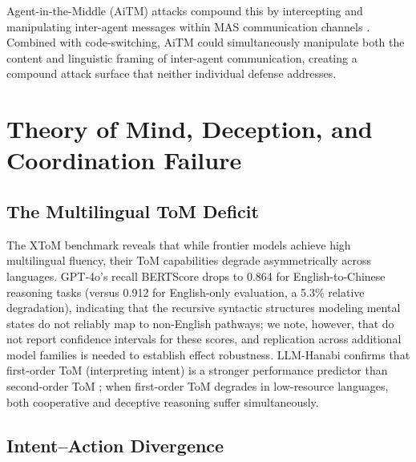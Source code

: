 \documentclass[11pt]{article}
\begin{document}
Agent-in-the-Middle (AiTM) attacks compound this by intercepting and manipulating inter-agent messages within MAS communication channels \citep{he2025agentmiddle}. Combined with code-switching, AiTM could simultaneously manipulate both the content and linguistic framing of inter-agent communication, creating a compound attack surface that neither individual defense addresses.

\section{Theory of Mind, Deception, and Coordination Failure}
\label{sec:tom}

\subsection{The Multilingual ToM Deficit}
\label{sec:tom_deficit}

The XToM benchmark \citep{chan2025xtom} reveals that while frontier models achieve high multilingual fluency, their ToM capabilities degrade asymmetrically across languages. GPT-4o's recall BERTScore drops to 0.864 for English-to-Chinese reasoning tasks (versus 0.912 for English-only evaluation, a 5.3\% relative degradation), indicating that the recursive syntactic structures modeling mental states do not reliably map to non-English pathways; we note, however, that \citet{chan2025xtom} do not report confidence intervals for these scores, and replication across additional model families is needed to establish effect robustness. LLM-Hanabi confirms that first-order ToM (interpreting intent) is a stronger performance predictor than second-order ToM \citep{chen2025llmhanabi}; when first-order ToM degrades in low-resource languages, both cooperative and deceptive reasoning suffer simultaneously.

\subsection{Intent--Action Divergence}
\label{sec:intent_action}
\end{document}
